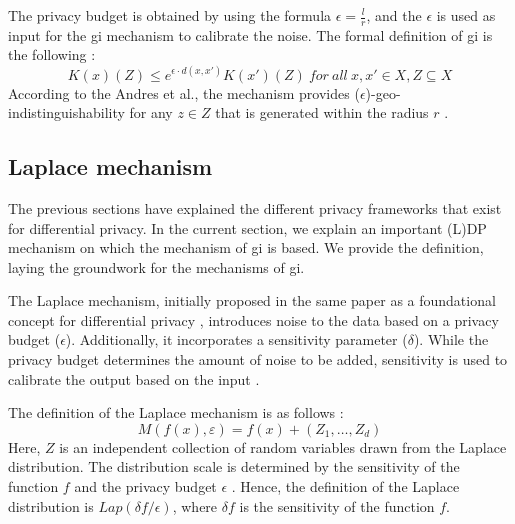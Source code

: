 The privacy budget is obtained by using the formula $\epsilon = \frac{l}{r}$, and the $\epsilon$ is used as input for the \gls{gi} mechanism to calibrate the noise. \newline
The formal definition of \gls{gi} is the following \citep{DBLP:journals/corr/abs-1212-1984}:
\begin{equation}
  K(x)(Z) \le e^{\epsilon \cdot d(x,x')} K(x')(Z) \ for \ all \ x,x' \in X, Z \subseteq X 
  \label{algo:2d-geo-indistinguishability}
\end{equation}
According to the Andres et al., the mechanism provides ($\epsilon$)-geo-indistinguishability for any $z \in Z$ that is generated within the radius $r$ \citep{DBLP:journals/corr/abs-1212-1984}.
\subsection{Laplace mechanism} \label{theory:laplace}
The previous sections have explained the different privacy frameworks that exist for differential privacy.
In the current section, we explain an important (L)DP mechanism on which the mechanism of \gls{gi} is based.
We provide the definition, laying the groundwork for the mechanisms of \gls{gi}.

The Laplace mechanism, initially proposed in the same paper as a foundational concept for differential privacy \citep{dwork_differential_2006},
introduces noise to the data based on a privacy budget ($\epsilon$).
Additionally, it incorporates a sensitivity parameter ($\delta$).
While the privacy budget determines the amount of noise to be added, sensitivity is used to calibrate the output based on the input \citep{del_rey_comprehensive_2020}.

The definition of the Laplace mechanism is as follows \citep{del_rey_comprehensive_2020}:
\begin{equation}
  M\left(f\left(x\right),\varepsilon\right)=f\left(x\right)+\left(Z_{1},\ldots,Z_{d}\right)
\end{equation}
Here, $Z$ is an independent collection of random variables drawn from the Laplace distribution.
The distribution scale is determined by the sensitivity of the function $f$ and the privacy budget $\epsilon$ \citep{del_rey_comprehensive_2020}.
Hence, the definition of the Laplace distribution is $Lap(\delta f/\epsilon)$, where $\delta f$ is the sensitivity of the function $f$. \newline

